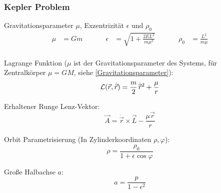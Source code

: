 		\subsubsection{Kepler Problem}
			\noindent
			Gravitationsparameter $\mu$, Exzentrizität $\epsilon$ und $\rho_0$
			\begin{equation}
				\begin{aligned}
					\mu &= G m &\hspace{30pt}
					\epsilon &= \sqrt{1+\frac{2 E L^2}{m \mu^2}} &\hspace{30pt}
					\rho_0 &= \frac{L^2}{m\mu} \\
				\end{aligned}
			\end{equation}

			\noindent
			Lagrange Funktion ($\mu$ ist der Gravitationsparameter des Systems, für Zentralkörper $\mu=GM$, siehe \ref{Gravitationsparameter}):
			\begin{equation}
				\mathcal{L}(\vec{r},\dot{\vec{r}}) = \frac{m}{2} \dot{\pvec{r}}^2 + \frac{\mu}{r}
			\end{equation}

			\noindent
			Erhaltener Runge Lenz-Vektor:
			\begin{equation}
				\vec{A} = \dot{\vec{r}}\times\vec{L} - \frac{\mu \vec{r}}{r}
			\end{equation}

			\noindent
			Orbit Parametrisierung (In Zylinderkoordinaten $\rho, \varphi$):
			\begin{equation}
				\rho = \frac{\rho_0}{1+\epsilon \cos\varphi}
			\end{equation}

			\noindent
			Große Halbachse $a$:
			\begin{equation}
				a = \frac{p}{1-\epsilon^2}
			\end{equation}
